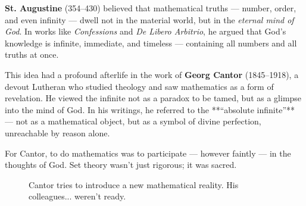 \begin{tcolorbox}[colback=gray!5!white, colframe=black!80!white, title={Historical Sidenote: Augustine, Cantor, and the Divine Infinite}]

  \textbf{St. Augustine} (354–430) believed that mathematical truths — number, order, and even infinity — dwell not in the material world, but in the \textit{eternal mind of God}. In works like \textit{Confessions} and \textit{De Libero Arbitrio}, he argued that God’s knowledge is infinite, immediate, and timeless — containing all numbers and all truths at once.

  \medskip

  This idea had a profound afterlife in the work of \textbf{Georg Cantor} (1845–1918), a devout Lutheran who studied theology and saw mathematics as a form of revelation. He viewed the infinite not as a paradox to be tamed, but as a glimpse into the mind of God. In his writings, he referred to the **“absolute infinite”** — not as a mathematical object, but as a symbol of divine perfection, unreachable by reason alone.

  \medskip

  For Cantor, to do mathematics was to participate — however faintly — in the thoughts of God. Set theory wasn’t just rigorous; it was sacred.
  
\end{tcolorbox}





\begin{figure}[H]
\centering
{}
\caption{Cantor tries to introduce a new mathematical reality. His colleagues... weren’t ready.}
\end{figure}







